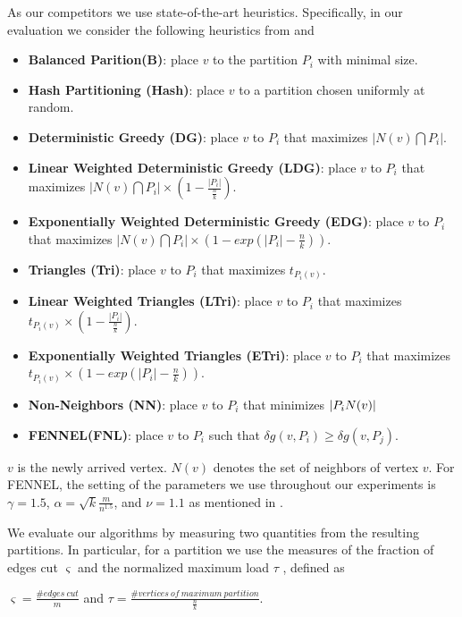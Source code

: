 \documentclass{sig-alternate-2013}
\begin{document}
As our competitors we use state-of-the-art heuristics.
Specifically, in our evaluation we consider the following heuristics from \cite{Stanton:streampartition} and \cite{Charalampos:fennel}
\begin{itemize}
  \item \textbf{Balanced Parition(B)}: place $v$ to the partition $P_i$ with minimal size.
  \item \textbf{Hash Partitioning (Hash)}: place $v$ to a partition chosen uniformly at random.
  \item \textbf{Deterministic Greedy (DG)}: place $v$ to $P_i$ that maximizes $|N(v)\bigcap P_i|$.
  \item \textbf{Linear Weighted Deterministic Greedy (LDG)}: place $v$ to $P_i$ that maximizes $|N(v)\bigcap P_i|\times (1-\frac{|P_i|}{\frac{n}{k}})$.
  \item \textbf{Exponentially Weighted Deterministic Greedy (EDG)}: place $v$ to $P_i$ that maximizes $|N(v)\bigcap P_i|\times (1-exp(|P_i|-\frac{n}{k}))$.
  \item \textbf{Triangles (Tri)}: place $v$ to $P_i$ that maximizes $t_{P_i(v)}$.
  \item \textbf{Linear Weighted Triangles (LTri)}: place $v$ to $P_i$ that maximizes $t_{P_i(v)}\times (1-\frac{|P_i|}{\frac{n}{k}})$.
  \item \textbf{Exponentially Weighted Triangles (ETri)}: place $v$ to $P_i$ that maximizes $t_{P_i(v)}\times (1-exp(|P_i|-\frac{n}{k}))$.
  \item \textbf{Non-Neighbors (NN)}: place $v$ to $P_i$ that minimizes $|P_i\\N(v)|$
  \item \textbf{FENNEL(FNL)}: place $v$ to $P_i$ such that $\delta g(v, P_i)\geq \delta g(v, P_j)$.
\end{itemize}
$v$ is the newly arrived vertex. $N(v)$ denotes the set of neighbors of vertex $v$. For FENNEL, the setting of the parameters we use throughout our experiments is $\gamma=1.5$, $ \alpha=\sqrt{k}\frac{m}{n^{1.5}}$, and $\nu = 1.1$ as mentioned in \cite{Charalampos:fennel}.

We evaluate our algorithms by measuring two quantities from the resulting partitions.
In particular, for a partition we use the measures of the fraction of edges cut $\varsigma$
and the normalized maximum load $\tau$ \cite{Charalampos:fennel}, defined as

$\varsigma = \frac{\# edges\ cut}{m}$ and
$\tau = \frac{\# vertices\ of\ maximum\ partition}{\frac{n}{k}}$.
\end{document}
